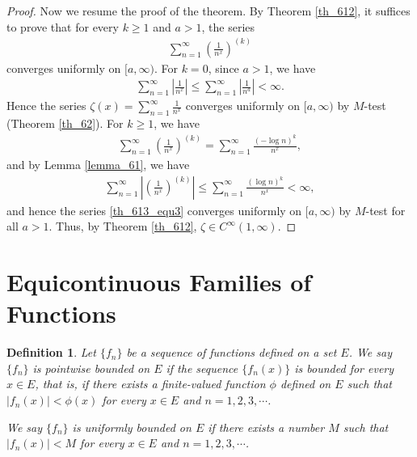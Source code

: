 \documentclass[11pt]{book}
\newtheorem{definition}{Definition}[chapter]
\theoremstyle{definition}
\numberwithin{equation}{chapter}
\begin{document}
\begin{proof}
\medskip

Now we resume the proof of the theorem. By Theorem \ref{th_612}, it suffices to prove that for every $k \geq 1$ and $a > 1$, the series
\begin{align}\label{th_613_equ3}
    \sum^\infty_{n=1} \left(\frac{1}{n^x}\right)^{(k)}
\end{align}
converges uniformly on $[a,\infty)$. For $k = 0$, since $a > 1$, we have
\begin{align*}
    \sum^\infty_{n=1} \left|\frac{1}{n^x}\right| \leq \sum^\infty_{n=1} \left|\frac{1}{n^a}\right| < \infty.
\end{align*}
Hence the series $\zeta(x) = \sum^\infty_{n=1} \frac{1}{n^x}$ converges uniformly on $[a,\infty)$ by $M$-test (Theorem \ref{th_62}). For $k \geq 1$, we have
\begin{align*}
    \sum^\infty_{n=1} \left(\frac{1}{n^x}\right)^{(k)} = \sum^\infty_{n=1} \frac{(- \log n)^k}{n^x},
\end{align*}
and by Lemma \ref{lemma_61}, we have
\begin{align*}
    \sum^\infty_{n=1} \left|\left(\frac{1}{n^x}\right)^{(k)}\right| \leq \sum^\infty_{n=1} \frac{(\log n)^k}{n^x} < \infty,
\end{align*}
and hence the series \eqref{th_613_equ3} converges uniformly on $[a,\infty)$ by $M$-test for all $a > 1$. Thus, by Theorem \ref{th_612}, $\zeta \in C^\infty(1,\infty)$.
\end{proof}

\medskip



\section{Equicontinuous Families of Functions}

\begin{definition}
Let $\{f_n\}$ be a sequence of functions defined on a set $E$. We say $\{f_n\}$ is pointwise bounded on $E$ if the sequence $\{f_n(x)\}$ is bounded for every $x \in E$, that is, if there exists a finite-valued function $\phi$ defined on $E$ such that $\left|f_n(x)\right| < \phi(x)$ for every $x \in E$ and $n = 1,2,3,\cdots$. 

We say $\{f_n\}$ is uniformly bounded on $E$ if there exists a number $M$ such that $\left|f_n(x)\right| < M$ for every $x \in E$ and $n = 1,2,3,\cdots$. 
\end{definition}

\medskip
\end{document}
